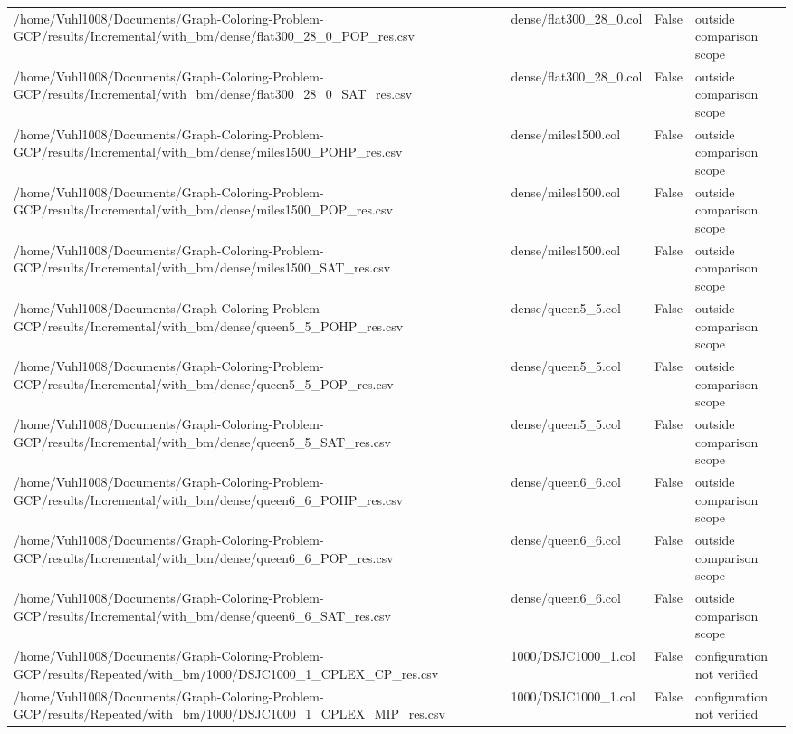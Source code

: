 \begin{table}[htbp]
\begin{tabular}{llll}
/home/Vuhl1008/Documents/Graph-Coloring-Problem-GCP/results/Incremental/with\_bm/dense/flat300\_28\_0\_POP\_res.csv & dense/flat300\_28\_0.col & False & outside comparison scope \\
/home/Vuhl1008/Documents/Graph-Coloring-Problem-GCP/results/Incremental/with\_bm/dense/flat300\_28\_0\_SAT\_res.csv & dense/flat300\_28\_0.col & False & outside comparison scope \\
/home/Vuhl1008/Documents/Graph-Coloring-Problem-GCP/results/Incremental/with\_bm/dense/miles1500\_POHP\_res.csv & dense/miles1500.col & False & outside comparison scope \\
/home/Vuhl1008/Documents/Graph-Coloring-Problem-GCP/results/Incremental/with\_bm/dense/miles1500\_POP\_res.csv & dense/miles1500.col & False & outside comparison scope \\
/home/Vuhl1008/Documents/Graph-Coloring-Problem-GCP/results/Incremental/with\_bm/dense/miles1500\_SAT\_res.csv & dense/miles1500.col & False & outside comparison scope \\
/home/Vuhl1008/Documents/Graph-Coloring-Problem-GCP/results/Incremental/with\_bm/dense/queen5\_5\_POHP\_res.csv & dense/queen5\_5.col & False & outside comparison scope \\
/home/Vuhl1008/Documents/Graph-Coloring-Problem-GCP/results/Incremental/with\_bm/dense/queen5\_5\_POP\_res.csv & dense/queen5\_5.col & False & outside comparison scope \\
/home/Vuhl1008/Documents/Graph-Coloring-Problem-GCP/results/Incremental/with\_bm/dense/queen5\_5\_SAT\_res.csv & dense/queen5\_5.col & False & outside comparison scope \\
/home/Vuhl1008/Documents/Graph-Coloring-Problem-GCP/results/Incremental/with\_bm/dense/queen6\_6\_POHP\_res.csv & dense/queen6\_6.col & False & outside comparison scope \\
/home/Vuhl1008/Documents/Graph-Coloring-Problem-GCP/results/Incremental/with\_bm/dense/queen6\_6\_POP\_res.csv & dense/queen6\_6.col & False & outside comparison scope \\
/home/Vuhl1008/Documents/Graph-Coloring-Problem-GCP/results/Incremental/with\_bm/dense/queen6\_6\_SAT\_res.csv & dense/queen6\_6.col & False & outside comparison scope \\
/home/Vuhl1008/Documents/Graph-Coloring-Problem-GCP/results/Repeated/with\_bm/1000/DSJC1000\_1\_CPLEX\_CP\_res.csv & 1000/DSJC1000\_1.col & False & configuration not verified \\
/home/Vuhl1008/Documents/Graph-Coloring-Problem-GCP/results/Repeated/with\_bm/1000/DSJC1000\_1\_CPLEX\_MIP\_res.csv & 1000/DSJC1000\_1.col & False & configuration not verified \\

\end{tabular}
\end{table}

